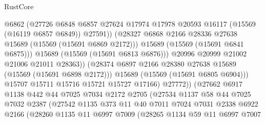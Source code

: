 \begin{lexlean}{RustCore}
\begin{coremodule}
                                  @6862
                                  (@27726
                                    @6848
                                    @6857
                                    @27624
                                    @17974
                                    @17978
                                    @20593
                                    @16117
                                    (@15569 (@16119 @6857 @6849))
                                    @27591))
                                (@28327
                                  @6868
                                  @2166
                                  @28336
                                  @27638
                                  @15689
                                  (@15569 (@15691 @6869 @2172)))
                                @15689
                                (@15569 (@15691 @6841 @6875)))
                              @15689
                              (@15569 (@15691 @6813 @6876)))
                            @20996
                            @20999
                            @21002
                            @21006
                            @21011
                            @28363))
                        (@28374 @6897 @2166 @28380 @27638 @15689 (@15569 (@15691 @6898 @2172)))
                        @15689
                        (@15569 (@15691 @6805 @6904)))
                      @15707
                      @15711
                      @15716
                      @15721
                      @15727
                      @17166)
                    @27772))
                (@27662
                  @6917
                  @1138
                  @442
                  @44
                  @7025
                  @7034
                  @2172
                  @2705
                  (@27534
                    @1137
                    @58
                    @44
                    @7025
                    @7032
                    @2387
                    (@27542
                      @1135
                      @373
                      @11
                      @40
                      @7011
                      @7024
                      @7031
                      @2338
                      @6922
                      @2166
                      (@28260
                        @1135
                        @11
                        @6997
                        @7009
                        (@28265
                          @1134
                          @59
                          @11
                          @6997
                          @7007

\end{coremodule}
\end{lexlean}
